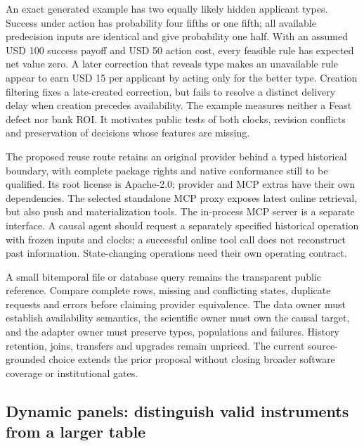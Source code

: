 An exact generated example has two equally likely hidden applicant
types. Success under action has probability four fifths or one fifth;
all available predecision inputs are identical and give probability one
half. With an assumed USD 100 success payoff and USD 50 action cost,
every feasible rule has expected net value zero. A later correction that
reveals type makes an unavailable rule appear to earn USD 15 per
applicant by acting only for the better type. Creation filtering fixes a
late-created correction, but fails to resolve a distinct delivery delay
when creation precedes availability. The example measures neither a
Feast defect nor bank ROI. It motivates public tests of both clocks,
revision conflicts and preservation of decisions whose features are
missing. \citep{exec19_feast_reference}

The proposed reuse route retains an original provider behind a typed
historical boundary, with complete package rights and native conformance
still to be qualified. Its root license is Apache-2.0; provider and MCP
extras have their own dependencies. The selected standalone MCP proxy
exposes latest online retrieval, but also push and materialization
tools. The in-process MCP server is a separate interface. A causal agent
should request a separately specified historical operation with frozen
inputs and clocks; a successful online tool call does not reconstruct
past information. State-changing operations need their own operating
contract. \citep{exec19_feast_source}

A small bitemporal file or database query remains the transparent public
reference. Compare complete rows, missing and conflicting states,
duplicate requests and errors before claiming provider equivalence. The
data owner must establish availability semantics, the scientific owner
must own the causal target, and the adapter owner must preserve types,
populations and failures. History retention, joins, transfers and
upgrades remain unpriced. The current source-grounded choice extends the
prior proposal without closing broader software coverage or
institutional gates. \citep{sp19coat_reader,sp19coat_progress}

\hypertarget{dynamic-panels-distinguish-valid-instruments-from-a-larger-table}{%
\subsection{Dynamic panels: distinguish valid instruments from a larger
table}\label{dynamic-panels-distinguish-valid-instruments-from-a-larger-table}}

